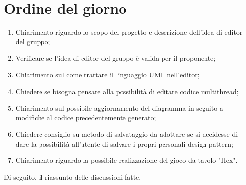 \documentclass[../AnalisiDeiRequisiti.tex]{subfiles}
\begin{document}
	\section*{Ordine del giorno}
		\begin{enumerate}
			\item Chiarimento riguardo lo scopo del progetto e descrizione dell'idea di editor
			del gruppo;
			\item Verificare se l'idea di editor del gruppo è valida per il proponente;
			\item Chiarimento sul come trattare il linguaggio UML nell'editor;
			\item Chiedere se bisogna pensare alla possibilità di editare codice multithread;
			\item Chiarimento sul possibile aggiornamento del diagramma in seguito a modifiche
			al codice precedentemente generato;
			\item Chiedere consiglio su metodo di salvataggio da adottare se si decidesse di
			dare la possibilità all'utente di salvare i propri personali design pattern;
			\item Chiarimento riguardo la possibile realizzazione del gioco da tavolo "Hex".
		\end{enumerate}
		Di seguito, il riassunto delle discussioni fatte.
\end{document}
